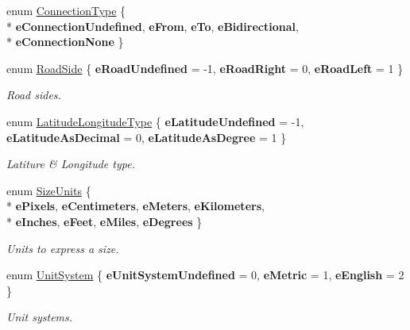 \begin{DoxyCompactItemize}
\item 
enum \hyperlink{namespaceGK_acff655917cf02cfbda984b465457ce74}{Connection\+Type} \{ \\*
{\bfseries e\+Connection\+Undefined}, 
{\bfseries e\+From}, 
{\bfseries e\+To}, 
{\bfseries e\+Bidirectional}, 
\\*
{\bfseries e\+Connection\+None}
 \}
\item 
enum \hyperlink{namespaceGK_adbf6d461cf314c17e29ca660da291274}{Road\+Side} \{ {\bfseries e\+Road\+Undefined} = -\/1, 
{\bfseries e\+Road\+Right} = 0, 
{\bfseries e\+Road\+Left} = 1
 \}\hypertarget{namespaceGK_adbf6d461cf314c17e29ca660da291274}{}\label{namespaceGK_adbf6d461cf314c17e29ca660da291274}
\begin{DoxyCompactList}\small\item\em Road sides. \end{DoxyCompactList}
\item 
enum \hyperlink{namespaceGK_af98710aa1bcc7d054724570e33aebda3}{Latitude\+Longitude\+Type} \{ {\bfseries e\+Latitude\+Undefined} = -\/1, 
{\bfseries e\+Latitude\+As\+Decimal} = 0, 
{\bfseries e\+Latitude\+As\+Degree} = 1
 \}\hypertarget{namespaceGK_af98710aa1bcc7d054724570e33aebda3}{}\label{namespaceGK_af98710aa1bcc7d054724570e33aebda3}
\begin{DoxyCompactList}\small\item\em Latiture \& Longitude type. \end{DoxyCompactList}
\item 
enum \hyperlink{namespaceGK_adde45307f3be11d926c291a749271263}{Size\+Units} \{ \\*
{\bfseries e\+Pixels}, 
{\bfseries e\+Centimeters}, 
{\bfseries e\+Meters}, 
{\bfseries e\+Kilometers}, 
\\*
{\bfseries e\+Inches}, 
{\bfseries e\+Feet}, 
{\bfseries e\+Miles}, 
{\bfseries e\+Degrees}
 \}\hypertarget{namespaceGK_adde45307f3be11d926c291a749271263}{}\label{namespaceGK_adde45307f3be11d926c291a749271263}
\begin{DoxyCompactList}\small\item\em Units to express a size. \end{DoxyCompactList}
\item 
enum \hyperlink{namespaceGK_adb84e06031348703b31fda55aa47f224}{Unit\+System} \{ {\bfseries e\+Unit\+System\+Undefined} = 0, 
{\bfseries e\+Metric} = 1, 
{\bfseries e\+English} = 2
 \}\hypertarget{namespaceGK_adb84e06031348703b31fda55aa47f224}{}\label{namespaceGK_adb84e06031348703b31fda55aa47f224}
\begin{DoxyCompactList}\small\item\em Unit systems. \end{DoxyCompactList}

\end{DoxyCompactItemize}
